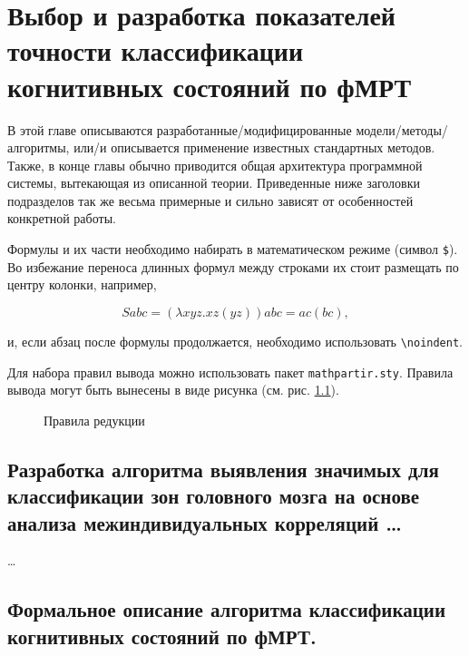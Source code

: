  \chapter{Выбор и разработка показателей точности классификации когнитивных состояний по фМРТ}

В этой главе описываются разработанные/модифицированные модели/методы/
алгоритмы, или/и описывается применение известных стандартных методов. Также, 
в конце главы обычно приводится общая архитектура программной системы, 
вытекающая из описанной теории. Приведенные ниже заголовки подразделов так же 
весьма примерные и сильно зависят от особенностей конкретной работы.

Формулы и их части необходимо набирать в математическом режиме
(символ \verb|$|). Во избежание переноса длинных формул между строками их 
стоит размещать по центру колонки, например,

$$S a b c = (\lambda x y z. x z (y z)) a b c = a c (b c),$$

\noindent и, если абзац после формулы продолжается, необходимо использовать 
\verb|\noindent|.

Для набора правил вывода можно использовать пакет \texttt{mathpartir.sty}. 
Правила вывода могут быть вынесены в виде рисунка (см. рис. 
\ref{img:inferrules}).

\begin{figure}[t]
  \centering
  \caption{Правила редукции}
  \label{img:inferrules}
\end{figure}

\section{Разработка алгоритма выявления значимых для классификации зон головного мозга на основе анализа межиндивидуальных корреляций \dots}

\dots




\section{Формальное описание алгоритма классификации когнитивных состояний по фМРТ.}






